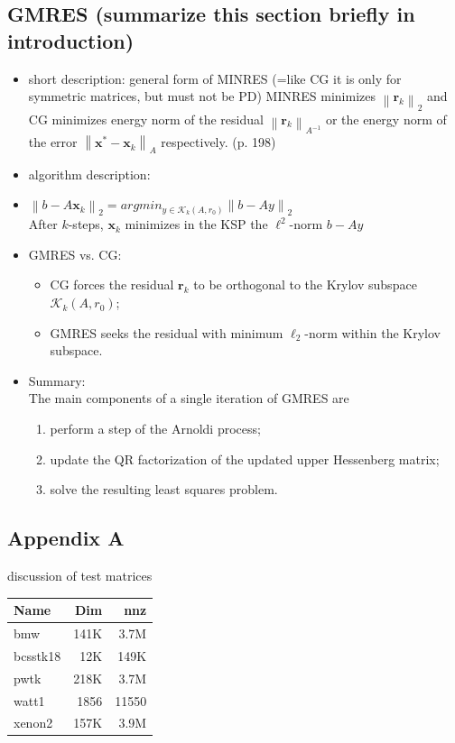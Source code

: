 \documentclass{scrartcl}
\numberwithin{equation}{section}
\newcommand{\norm}[1]{\left\lVert#1\right\rVert}
\begin{document}
\subsection*{GMRES (summarize this section briefly in introduction)}
\begin{itemize}
\item short description: general form of MINRES (=like CG it is only for symmetric matrices, but must not be PD) MINRES minimizes $\norm{\textbf{r}_k}_2$ and CG minimizes energy norm of the residual $\norm{\textbf{r}_k}_{A^{-1}}$ or the energy norm of the error $\norm{\textbf{x}^* - \textbf{x}_k}_A$ respectively. \cite{Ascher:2011:FCN:2031413} (p. 198)
\item algorithm description:
\item $\norm{b - A\textbf{x}_k}_2 = argmin_{y \in \mathcal{K}_k(A, r_0)}\norm{b - Ay}_2$\\
	 After $k$-steps, $\textbf{x}_k$ minimizes in the KSP the $\ell^2$-norm $b - Ay$
\item GMRES vs. CG:
\begin{itemize}
\item CG forces the residual $\textbf{r}_k$ to be orthogonal to the Krylov subspace $\mathcal{K}_k(A, r_0)$;
\item GMRES seeks the residual with minimum $\ell_2$-norm within the Krylov subspace.
\end{itemize}
\item Summary:\\
The main components of a single iteration of GMRES are
\begin{enumerate}
	\item perform a step of the Arnoldi process;
	\item update the QR factorization of the updated upper Hessenberg matrix;
	\item solve the resulting least squares problem.
	\end{enumerate}
\end{itemize}



 \listofalgorithms
\begin{appendices}
\section*{Appendix A}
discussion of test matrices \\

\begin{tabular}{l|r|r}
Name & Dim & nnz \\
\hline
bmw & 141K & 3.7M \\
bcsstk18 & 12K & 149K \\
pwtk & 218K & 3.7M \\
watt1 & 1856 & 11550 \\
xenon2 & 157K & 3.9M
\end{tabular}
\end{appendices}
\end{document}
